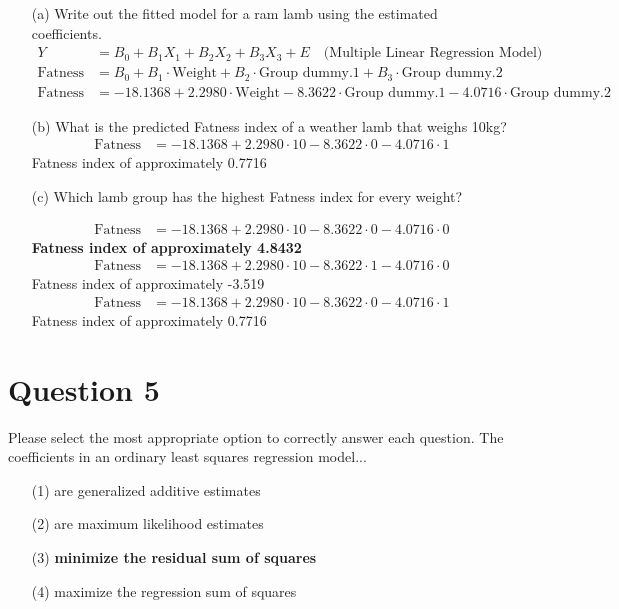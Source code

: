 \documentclass[12pt,letterpaper]{article}
\begin{document}
\begin{enumerate}
	\item [(a)] Write out the fitted model for a ram lamb using the estimated coefficients.
\begin{align*}
	Y &= B_0 + B_1X_1 + B_2X_2 + B_3X_3 + E \quad \text{(Multiple Linear Regression Model)} \\
	\text{Fatness} &= B_0 + B_1 \cdot \text{Weight} + B_2 \cdot \text{Group dummy.1} + B_3 \cdot \text{Group dummy.2}\\
	\text{Fatness} &= -18.1368 + 2.2980 \cdot \text{Weight} - 8.3622 \cdot \text{Group dummy.1} - 4.0716 \cdot \text{Group dummy.2}
\end{align*}
	
	
	\item [(b)] What is the predicted Fatness index of a weather lamb that weighs 10kg?
	\begin{align*}
		\text{Fatness} &= -18.1368 + 2.2980 \cdot \text{10} - 8.3622 \cdot \text{0} - 4.0716 \cdot \text{1}
	\end{align*}
	Fatness index of approximately 0.7716
	
	
	\item [(c)] Which lamb group has the highest Fatness index for every weight?
	
\begin{align*}
	\text{Fatness} &= -18.1368 + 2.2980 \cdot \text{10} - 8.3622 \cdot \text{0} - 4.0716 \cdot \text{0}
\end{align*}	
	\textbf{Fatness index of approximately 4.8432}
	\begin{align*}
	\text{Fatness} &= -18.1368 + 2.2980 \cdot \text{10} - 8.3622 \cdot \text{1} - 4.0716 \cdot \text{0}
\end{align*}
	Fatness index of approximately -3.519
	\begin{align*}
	\text{Fatness} &= -18.1368 + 2.2980 \cdot \text{10} - 8.3622 \cdot \text{0} - 4.0716 \cdot \text{1}
\end{align*}	
	Fatness index of approximately 0.7716
	
\end{enumerate}


\newpage

\section*{Question 5}
\vspace{.25cm}
\noindent Please select the most appropriate option to correctly answer each question. The coefficients in an ordinary least squares regression model...
\begin{enumerate}
	
	\item [(1)] are generalized additive estimates
	\item [(2)] are maximum likelihood estimates
	\item [(3)] \textbf{minimize the residual sum of squares}\
	\item [(4)] maximize the regression sum of squares
			
\end{enumerate}
\end{document}
